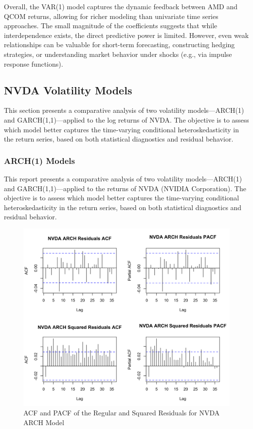 \documentclass[12pt]{article}
\begin{document}
Overall, the VAR(1) model captures the dynamic feedback between AMD and QCOM returns, allowing for richer modeling than univariate time series approaches. The small magnitude of the coefficients suggests that while interdependence exists, the direct predictive power is limited. However, even weak relationships can be valuable for short-term forecasting, constructing hedging strategies, or understanding market behavior under shocks (e.g., via impulse response functions). 
\newpage

\subsection*{NVDA Volatility Models}

This section presents a comparative analysis of two volatility models—ARCH(1) and GARCH(1,1)—applied to the log returns of NVDA. The objective is to assess which model better captures the time-varying conditional heteroskedasticity in the return series, based on both statistical diagnostics and residual behavior.

\subsubsection*{ARCH(1) Models}

This report presents a comparative analysis of two volatility models—ARCH(1) and GARCH(1,1)—applied to the returns of NVDA (NVIDIA Corporation). The objective is to assess which model better captures the time-varying conditional heteroskedasticity in the return series, based on both statistical diagnostics and residual behavior.

\begin{figure}[!h]
	\centering
	\includegraphics[width=0.8\linewidth]{plots/ARCH_NVDA.png}
	\caption{ACF and PACF of the Regular and Squared Residuals for NVDA ARCH Model}
	\label{fig:nvda_arch}
\end{figure}
\end{document}
